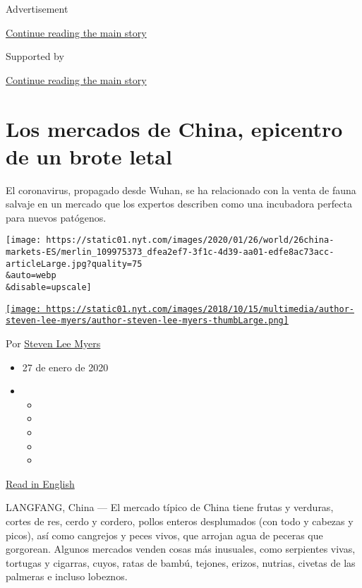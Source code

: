 Advertisement

\protect\hyperlink{after-top}{Continue reading the main story}

Supported by

\protect\hyperlink{after-sponsor}{Continue reading the main story}

\hypertarget{los-mercados-de-china-epicentro-de-un-brote-letal}{%
\section{Los mercados de China, epicentro de un brote
letal}\label{los-mercados-de-china-epicentro-de-un-brote-letal}}

El coronavirus, propagado desde Wuhan, se ha relacionado con la venta de
fauna salvaje en un mercado que los expertos describen como una
incubadora perfecta para nuevos patógenos.

\texttt{[image: https://static01.nyt.com/images/2020/01/26/world/26china-markets-ES/merlin\_109975373\_dfea2ef7-3f1c-4d39-aa01-edfe8ac73acc-articleLarge.jpg?quality=75\\\&auto=webp\\\&disable=upscale]}

\href{https://www.nytimes.com/by/steven-lee-myers}{\texttt{[image: https://static01.nyt.com/images/2018/10/15/multimedia/author-steven-lee-myers/author-steven-lee-myers-thumbLarge.png]}}

Por \href{https://www.nytimes.com/by/steven-lee-myers}{Steven Lee Myers}

\begin{itemize}
\item
  27 de enero de 2020
\item
  \begin{itemize}
  \item
  \item
  \item
  \item
  \item
  \end{itemize}
\end{itemize}

\href{https://www.nytimes.com/2020/01/25/world/asia/china-markets-coronavirus-sars.html}{Read
in English}

LANGFANG, China --- El mercado típico de China tiene frutas y verduras,
cortes de res, cerdo y cordero, pollos enteros desplumados (con todo y
cabezas y picos), así como cangrejos y peces vivos, que arrojan agua de
peceras que gorgorean. Algunos mercados venden cosas más inusuales, como
serpientes vivas, tortugas y cigarras, cuyos, ratas de bambú, tejones,
erizos, nutrias, civetas de las palmeras e incluso lobeznos.

